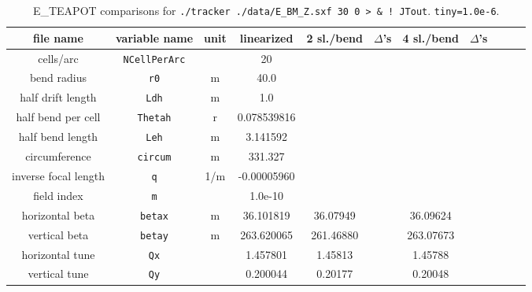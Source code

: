 \documentclass[12pt]{article}
\begin{document}
%
\begin{table}[h]
\caption{\label{tbl:benchmarkParams.Z_}E\_TEAPOT comparisons for
{\tt ./tracker ./data/E\_BM\_Z.sxf 30 0 > \& ! JTout}. {\tt tiny=1.0e-6}.
}
\medskip
\centering
\begin{tabular}{|c|c|c|c|c|c|c|c|c|c|c|}           \hline
file name         & variable name     & unit  &  linearized  & 2 sl./bend  & $\Delta$'s & 4 sl./bend & $\Delta$'s \\ \hline
cells/arc         & {\tt NCellPerArc} &       &       20     &   & & &     \\
bend radius       &  {\tt r0}         &  m    &      40.0    &   & & &   \\
half drift length &  {\tt Ldh}        &  m    &     1.0      &   & & &   \\
half bend per cell & {\tt Thetah}     &  r    &  0.078539816 &   & & &   \\
half bend length  & {\tt Leh}         &  m    &  3.141592    &   & & &   \\
circumference     & {\tt circum}      &  m    &   331.327    &   & & &   \\ 
inverse focal length &  {\tt q}       & 1/m   & -0.00005960  &   & & &   \\
field index       &  {\tt m}          &       &  1.0e-10     &   & & &   \\ \hline
horizontal beta  & {\tt betax}       &  m     &  36.101819   &   36.07949 & & 36.09624  &  \\ 
vertical beta     & {\tt betay}       &  m    & 263.620065   &  261.46880 & & 263.07673 &  \\
horizontal tune  &  {\tt Qx}         &        &   1.457801   &    1.45813 & & 1.45788  &  \\
vertical tune     &  {\tt Qy}         &       &   0.200044   &    0.20177 & & 0.20048  &  \\ \hline        
\end{tabular}
\end{table}
%
\end{document}
